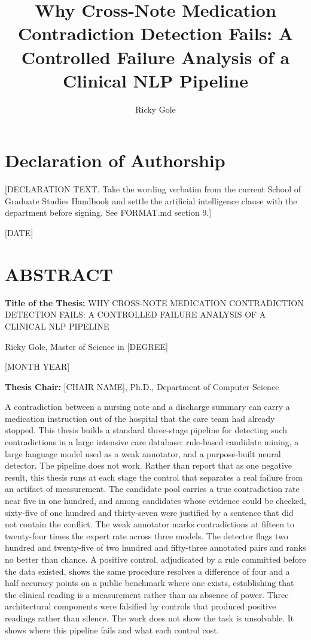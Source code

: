 \documentclass[12pt]{report}
\title{Why Cross-Note Medication Contradiction Detection Fails: A Controlled Failure Analysis of a Clinical NLP Pipeline}
\author{Ricky Gole}
\date{}
\begin{document}

\section*{Declaration of Authorship}

[DECLARATION TEXT. Take the wording verbatim from the current School of Graduate
Studies Handbook and settle the artificial intelligence clause with the department
before signing. See FORMAT.md section 9.]

[DATE]

\newpage
\section*{ABSTRACT}

\textbf{Title of the Thesis:} WHY CROSS-NOTE MEDICATION CONTRADICTION DETECTION
FAILS: A CONTROLLED FAILURE ANALYSIS OF A CLINICAL NLP PIPELINE

Ricky Gole, Master of Science in [DEGREE]

[MONTH YEAR]

\textbf{Thesis Chair:} [CHAIR NAME], Ph.D., Department of Computer Science

A contradiction between a nursing note and a discharge summary can carry a medication instruction out of the hospital that the care team had already stopped. This thesis builds a standard three-stage pipeline for detecting such contradictions in a large intensive care database: rule-based candidate mining, a large language model used as a weak annotator, and a purpose-built neural detector. The pipeline does not work. Rather than report that as one negative result, this thesis runs at each stage the control that separates a real failure from an artifact of measurement. The candidate pool carries a true contradiction rate near five in one hundred, and among candidates whose evidence could be checked, sixty-five of one hundred and thirty-seven were justified by a sentence that did not contain the conflict. The weak annotator marks contradictions at fifteen to twenty-four times the expert rate across three models. The detector flags two hundred and twenty-five of two hundred and fifty-three annotated pairs and ranks no better than chance. A positive control, adjudicated by a rule committed before the data existed, shows the same procedure resolves a difference of four and a half accuracy points on a public benchmark where one exists, establishing that the clinical reading is a measurement rather than an absence of power. Three architectural components were falsified by controls that produced positive readings rather than silence. The work does not show the task is unsolvable. It shows where this pipeline fails and what each control cost.
\end{document}
